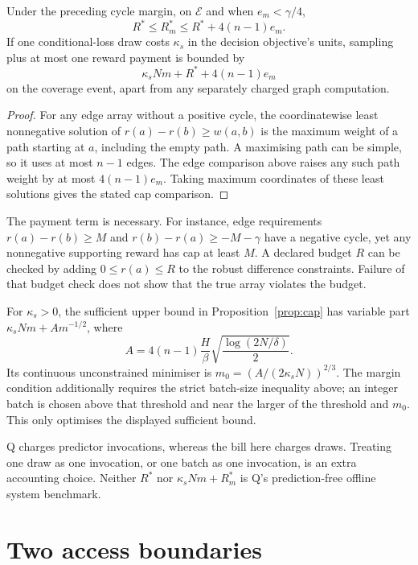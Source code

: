\documentclass{article}
\begin{document}
\begin{proposition}\label{prop:cap}
Under the preceding cycle margin, on \(\mathcal E\) and when
\(e_m<\gamma/4\),
\[
R^*\leq R_m^*\leq R^*+4(n-1)e_m.
\]
If one conditional-loss draw costs \(\kappa_s\) in the decision
objective's units, sampling plus at most one reward payment is bounded by
\[
\kappa_sNm+R^*+4(n-1)e_m
\]
on the coverage event, apart from any separately charged graph computation.
\end{proposition}

\begin{proof}
For any edge array without a positive cycle, the coordinatewise least
nonnegative solution of \(r(a)-r(b)\geq w(a,b)\) is the maximum weight
of a path starting at \(a\), including the empty path. A maximising path
can be simple, so it uses at most \(n-1\) edges. The edge comparison above
raises any such path weight by at most \(4(n-1)e_m\). Taking maximum
coordinates of these least solutions gives the stated cap comparison.
\end{proof}

The payment term is necessary. For instance, edge requirements
\(r(a)-r(b)\geq M\) and
\(r(b)-r(a)\geq-M-\gamma\) have a negative cycle, yet any
nonnegative supporting reward has cap at least \(M\). A declared budget
\(R\) can be checked by adding \(0\leq r(a)\leq R\) to the robust
difference constraints. Failure of that budget check does not show that
the true array violates the budget.

For \(\kappa_s>0\), the sufficient upper bound in
Proposition~\ref{prop:cap} has variable part
\(\kappa_sNm+A m^{-1/2}\), where
\[
A=4(n-1)\frac{H}{\beta}
\sqrt{\frac{\log(2N/\delta)}{2}}.
\]
Its continuous unconstrained minimiser is
\(m_0=(A/(2\kappa_sN))^{2/3}\). The margin condition additionally
requires the strict batch-size inequality above; an integer batch is
chosen above that threshold and near the larger of the threshold and
\(m_0\). This only optimises the displayed sufficient bound.

Q charges predictor invocations, whereas the bill here charges draws.
Treating one draw as one invocation, or one batch as one invocation, is an
extra accounting choice. Neither \(R^*\) nor
\(\kappa_sNm+R_m^*\) is Q's prediction-free offline system benchmark.

\section{Two access boundaries}
\end{document}
